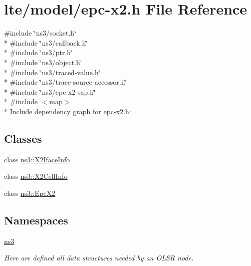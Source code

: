 \hypertarget{epc-x2_8h}{}\section{lte/model/epc-\/x2.h File Reference}
\label{epc-x2_8h}
{\ttfamily \#include \char`\"{}ns3/socket.\+h\char`\"{}}\\*
{\ttfamily \#include \char`\"{}ns3/callback.\+h\char`\"{}}\\*
{\ttfamily \#include \char`\"{}ns3/ptr.\+h\char`\"{}}\\*
{\ttfamily \#include \char`\"{}ns3/object.\+h\char`\"{}}\\*
{\ttfamily \#include \char`\"{}ns3/traced-\/value.\+h\char`\"{}}\\*
{\ttfamily \#include \char`\"{}ns3/trace-\/source-\/accessor.\+h\char`\"{}}\\*
{\ttfamily \#include \char`\"{}ns3/epc-\/x2-\/sap.\+h\char`\"{}}\\*
{\ttfamily \#include $<$map$>$}\\*
Include dependency graph for epc-\/x2.h\+:
\subsection*{Classes}
\begin{DoxyCompactItemize}
\item 
class \hyperlink{classns3_1_1X2IfaceInfo}{ns3\+::\+X2\+Iface\+Info}
\item 
class \hyperlink{classns3_1_1X2CellInfo}{ns3\+::\+X2\+Cell\+Info}
\item 
class \hyperlink{classns3_1_1EpcX2}{ns3\+::\+Epc\+X2}
\end{DoxyCompactItemize}
\subsection*{Namespaces}
\begin{DoxyCompactItemize}
\item 
 \hyperlink{namespacens3}{ns3}
\begin{DoxyCompactList}\small\item\em Here are defined all data structures needed by an O\+L\+SR node. \end{DoxyCompactList}\end{DoxyCompactItemize}

